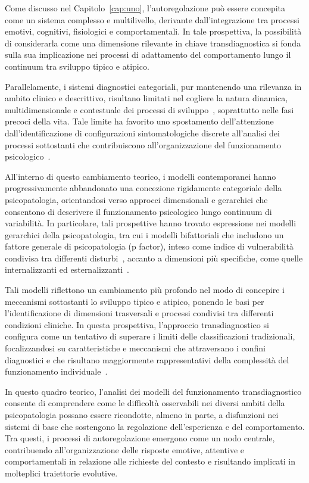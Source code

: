         Come discusso nel Capitolo~\ref{cap:uno}, l'autoregolazione può essere concepita come un sistema complesso e multilivello, derivante dall'integrazione tra processi emotivi, cognitivi, fisiologici e comportamentali. In tale prospettiva, la possibilità di considerarla come una dimensione rilevante in chiave transdiagnostica si fonda sulla sua implicazione nei processi di adattamento del comportamento lungo il continuum tra sviluppo tipico e atipico.

        Parallelamente, i sistemi diagnostici categoriali, pur mantenendo una rilevanza in ambito clinico e descrittivo, risultano limitati nel cogliere la natura dinamica, multidimensionale e contestuale dei processi di sviluppo~\cite{kotov2017}, soprattutto nelle fasi precoci della vita. Tale limite ha favorito uno spostamento dell'attenzione dall'identificazione di configurazioni sintomatologiche discrete all'analisi dei processi sottostanti che contribuiscono all'organizzazione del funzionamento psicologico~\cite{nolenhoeksema2011}.

        All'interno di questo cambiamento teorico, i modelli contemporanei hanno progressivamente abbandonato una concezione rigidamente categoriale della psicopatologia, orientandosi verso approcci dimensionali e gerarchici che consentono di descrivere il funzionamento psicologico lungo continuum di variabilità. In particolare, tali prospettive hanno trovato espressione nei modelli gerarchici della psicopatologia, tra cui i modelli bifattoriali che includono un fattore generale di psicopatologia (p factor), inteso come indice di vulnerabilità condivisa tra differenti disturbi~\cite{caspi2014}, accanto a dimensioni più specifiche, come quelle internalizzanti ed esternalizzanti~\cite{kotov2017}.

        Tali modelli riflettono un cambiamento più profondo nel modo di concepire i meccanismi sottostanti lo sviluppo tipico e atipico, ponendo le basi per l'identificazione di dimensioni trasversali e processi condivisi tra differenti condizioni cliniche. In questa prospettiva, l'approccio transdiagnostico si configura come un tentativo di superare i limiti delle classificazioni tradizionali, focalizzandosi su caratteristiche e meccanismi che attraversano i confini diagnostici e che risultano maggiormente rappresentativi della complessità del funzionamento individuale~\cite{nolenhoeksema2011,astle2022}.

        In questo quadro teorico, l'analisi dei modelli del funzionamento transdiagnostico consente di comprendere come le difficoltà osservabili nei diversi ambiti della psicopatologia possano essere ricondotte, almeno in parte, a disfunzioni nei sistemi di base che sostengono la regolazione dell'esperienza e del comportamento. Tra questi, i processi di autoregolazione emergono come un nodo centrale, contribuendo all'organizzazione delle risposte emotive, attentive e comportamentali in relazione alle richieste del contesto e risultando implicati in molteplici traiettorie evolutive.

